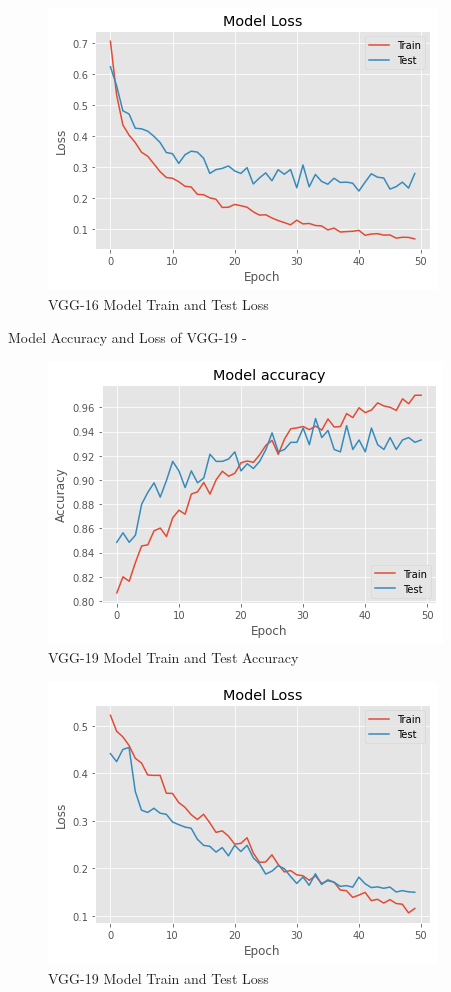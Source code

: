 \vspace{5mm}
\begin{figure}[hbt!]
\centering
\includegraphics[scale=1]{images/fig-26.png}
\caption{VGG-16 Model Train and Test Loss}
\label{fig:x VGG-16 Model Train and Test Loss}
\end{figure}

\newpage
Model Accuracy and Loss of VGG-19 -

\vspace{5mm}
\begin{figure}[hbt!]
\centering
\includegraphics[scale=1]{images/fig-27.png}
\caption{VGG-19 Model Train and Test Accuracy}
\label{fig:x VGG-19 Model Train and Test Accuracy}
\end{figure}

\vspace{5mm}
\begin{figure}[hbt!]
\centering
\includegraphics[scale=1]{images/fig-28.png}
\caption{VGG-19 Model Train and Test Loss}
\label{fig:x VGG-19 Model Train and Test Loss}
\end{figure}

